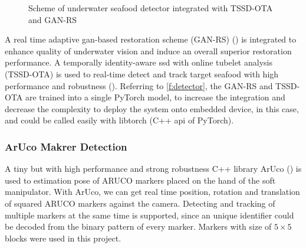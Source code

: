 \begin{figure}[htb]
    \caption[Scheme of Underwater Seafood Detector]{Scheme of underwater seafood
        detector integrated with TSSD-OTA and GAN-RS}\label{f:detector}
\end{figure}

A real time adaptive \gls{gan}-based restoration scheme (GAN-RS)
(\cite{chen2019towards}) is integrated to enhance quality of underwater vision
and induce an overall superior restoration performance. A temporally
identity-aware \gls{ssd} with online tubelet analysis (TSSD-OTA) is used to
real-time detect and track target seafood with high performance and robustness
(\cite{chen2019temporally}). Referring to \autoref{f:detector}, the GAN-RS and
TSSD-OTA are trained into a single PyTorch model, to increase the integration
and decrease the complexity to deploy the system onto embedded device,
 in this case, and could be called easily with libtorch (C++
\gls{api} of PyTorch).

\subsubsection{ArUco Makrer Detection}

A tiny but with high performance and strong robustness C++ library ArUco
(\cite{romero2018speeded,garrido2016generation}) is used to estimation pose of
ARUCO markers placed on the hand of the soft manipulator. With ArUco, we can get
real time position, rotation and translation of squared ARUCO markers against
the camera. Detecting and tracking of multiple markers at the same time is
supported, since an unique identifier could be decoded from the binary pattern
of every marker. Markers with size of \(5\times5\) blocks were used in this project.

